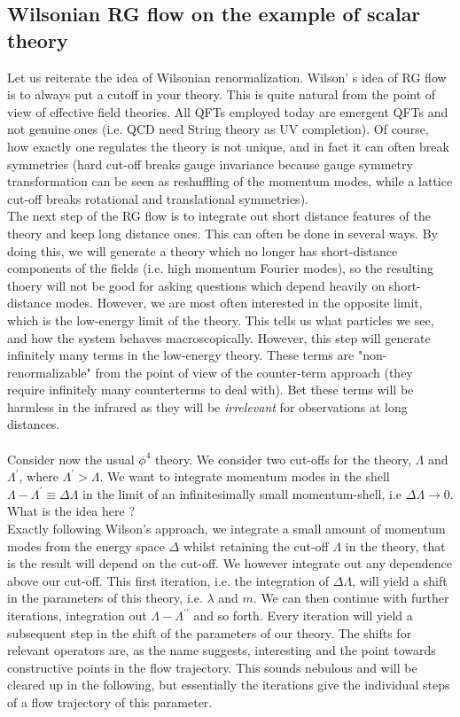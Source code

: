 \subsection{Wilsonian RG flow on the example of scalar theory}
Let us reiterate the idea of Wilsonian renormalization. Wilson' s idea of RG flow is to always put a cutoff in your theory. This is quite natural from the point of view of effective field theories. All QFTs employed today are emergent QFTs and not genuine ones (i.e. QCD need String theory as UV completion). Of course, how exactly one regulates the theory is not unique, and in fact it can often break symmetries (hard cut-off breaks gauge invariance because gauge symmetry transformation can be seen as reshuffling of the momentum modes, while a lattice cut-off breaks rotational and translational symmetries).\\
The next step of the RG flow is to integrate out short distance features of the theory and keep long distance ones.
This can often be done in several ways. By doing this, we will generate a theory which no longer has short-distance components of the fields (i.e. high momentum Fourier modes), so the resulting thoery will not be good for asking questions which depend heavily on short-distance modes. However, we are most often interested in the opposite limit, which is the low-energy limit of the theory. This tells us what particles we see, and how the system behaves macroscopically. However, this step will generate infinitely many terms in the low-energy theory. These terms are "non-renormalizable" from the point of view of the counter-term approach (they require infinitely many counterterms to deal with). Bet these terms will be harmless in the infrared as they will be \emph{irrelevant} for observations at long distances.\\
\\
Consider now the usual $\phi^4$ theory. We consider two cut-offs for the theory, $\Lambda$ and $\Lambda^\prime$, where $\Lambda^\prime >\Lambda$. We want to integrate momentum modes in the shell $\Lambda-\Lambda^\prime \equiv \Delta \Lambda$ in the limit of an infinitesimally small momentum-shell, i.e  $\Delta \Lambda \rightarrow 0$. What is the idea here ?\\
Exactly following Wilson's approach, we integrate a small amount of momentum modes from the energy space $\Delta$ whilst retaining the cut-off $\Lambda$ in the  theory, that is the result will depend on the cut-off. We however integrate out any dependence above our cut-off. This first iteration, i.e. the integration of $\Delta\Lambda$, will yield a shift in the parameters of this theory, i.e. $\lambda$ and $m$. We can then continue with further iterations, integration out $\Lambda-\Lambda^{\prime \prime }$ and so forth. Every iteration will yield a subsequent step in the shift of the parameters of our theory. The shifts for relevant operators are, as the name suggests, interesting and the point towards constructive points in the flow trajectory. This sounds nebulous and will be cleared up in the following, but essentially the iterations give the individual steps of a flow trajectory of this parameter.\\
